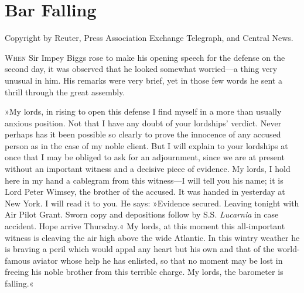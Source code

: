 
\chapter{Bar Falling}

\epigraph{Copyright by Reuter, Press Association Exchange Telegraph, and Central News.}{}


\lettrine[lines=4]{W}{hen} Sir Impey Biggs rose to make his opening speech for the defense on the second day, it was observed that he looked somewhat worried\allowbreak---\allowbreak a thing very unusual in him. His remarks were very brief, yet in those few words he sent a thrill through the great assembly.

»My lords, in rising to open this defense I find myself in a more than usually anxious position. Not that I have any doubt of your lordships' verdict. Never perhaps has it been possible so clearly to prove the innocence of any accused person as in the case of my noble client. But I will explain to your lordships at once that I may be obliged to ask for an adjournment, since we are at present without an important witness and a decisive piece of evidence. My lords, I hold here in my hand a cablegram from this witness\allowbreak---\allowbreak I will tell you his name; it is Lord Peter Wimsey, the brother of the accused. It was handed in yesterday at New York. I will read it to you. He says: »Evidence secured. Leaving tonight with Air Pilot Grant. Sworn copy and depositions follow by S.S. \textit{Lucarnia} in case accident. Hope arrive Thursday.« My lords, at this moment this all-important witness is cleaving the air high above the wide Atlantic. In this wintry weather he is braving a peril which would appal any heart but his own and that of the world-famous aviator whose help he has enlisted, so that no moment may be lost in freeing his noble brother from this terrible charge. My lords, the barometer is falling.«

